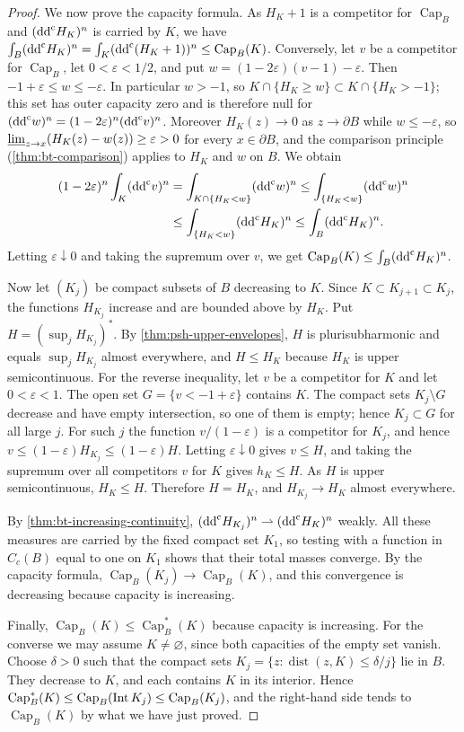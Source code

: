 \begin{proof}
We now prove the capacity formula. As $H_K+1$ is a competitor for $\operatorname{Cap}_B$ and $(\mathrm{dd}^{\mathrm{c}} H_K)^n$ is carried by $K$, we have $\int_B(\mathrm{dd}^{\mathrm{c}} H_K)^n=\int_K(\mathrm{dd}^{\mathrm{c}}(H_K+1))^n\le\operatorname{Cap}_B(K)$. Conversely, let $v$ be a competitor for $\operatorname{Cap}_B$, let $0<\varepsilon<1/2$, and put $w=(1-2\varepsilon)(v-1)-\varepsilon$. Then $-1+\varepsilon\le w\le-\varepsilon$. In particular $w>-1$, so $K\cap\{H_K\ge w\}\subset K\cap\{H_K>-1\}$; this set has outer capacity zero and is therefore null for $(\mathrm{dd}^{\mathrm{c}} w)^n=(1-2\varepsilon)^n(\mathrm{dd}^{\mathrm{c}} v)^n$. Moreover $H_K(z)\to0$ as $z\to\partial B$ while $w\le-\varepsilon$, so $\varliminf_{z\to x}(H_K(z)-w(z))\ge\varepsilon>0$ for every $x\in\partial B$, and the comparison principle (\cref{thm:bt-comparison}) applies to $H_K$ and $w$ on $B$. We obtain
\[
 \begin{aligned}
 (1-2\varepsilon)^n\int_K(\mathrm{dd}^{\mathrm{c}} v)^n
 &=\int_{K\cap\{H_K<w\}}(\mathrm{dd}^{\mathrm{c}} w)^n
 \le\int_{\{H_K<w\}}(\mathrm{dd}^{\mathrm{c}} w)^n\\
 &\le\int_{\{H_K<w\}}(\mathrm{dd}^{\mathrm{c}} H_K)^n
 \le\int_B(\mathrm{dd}^{\mathrm{c}} H_K)^n.
 \end{aligned}
\]
Letting $\varepsilon\downarrow0$ and taking the supremum over $v$, we get $\operatorname{Cap}_B(K)\le\int_B(\mathrm{dd}^{\mathrm{c}} H_K)^n$.

Now let $(K_j)$ be compact subsets of $B$ decreasing to $K$. Since $K\subset K_{j+1}\subset K_j$, the functions $H_{K_j}$ increase and are bounded above by $H_K$. Put $H=(\sup_jH_{K_j})^*$. By \cref{thm:psh-upper-envelopes}, $H$ is plurisubharmonic and equals $\sup_jH_{K_j}$ almost everywhere, and $H\le H_K$ because $H_K$ is upper semicontinuous. For the reverse inequality, let $v$ be a competitor for $K$ and let $0<\varepsilon<1$. The open set $G=\{v<-1+\varepsilon\}$ contains $K$. The compact sets $K_j\setminus G$ decrease and have empty intersection, so one of them is empty; hence $K_j\subset G$ for all large $j$. For such $j$ the function $v/(1-\varepsilon)$ is a competitor for $K_j$, and hence $v\le(1-\varepsilon)H_{K_j}\le(1-\varepsilon)H$. Letting $\varepsilon\downarrow0$ gives $v\le H$, and taking the supremum over all competitors $v$ for $K$ gives $h_K\le H$. As $H$ is upper semicontinuous, $H_K\le H$. Therefore $H=H_K$, and $H_{K_j}\to H_K$ almost everywhere.

By \cref{thm:bt-increasing-continuity}, $(\mathrm{dd}^{\mathrm{c}} H_{K_j})^n\rightharpoonup(\mathrm{dd}^{\mathrm{c}} H_K)^n$ weakly. All these measures are carried by the fixed compact set $K_1$, so testing with a function in $C_c(B)$ equal to one on $K_1$ shows that their total masses converge. By the capacity formula, $\operatorname{Cap}_B(K_j)\to\operatorname{Cap}_B(K)$, and this convergence is decreasing because capacity is increasing.

Finally, $\operatorname{Cap}_B(K)\le\operatorname{Cap}_B^*(K)$ because capacity is increasing. For the converse we may assume $K\neq\varnothing$, since both capacities of the empty set vanish. Choose $\delta>0$ such that the compact sets $K_j=\{z:\operatorname{dist}(z,K)\le\delta/j\}$ lie in $B$. They decrease to $K$, and each contains $K$ in its interior. Hence $\operatorname{Cap}_B^*(K)\le\operatorname{Cap}_B(\operatorname{Int} K_j)\le\operatorname{Cap}_B(K_j)$, and the right-hand side tends to $\operatorname{Cap}_B(K)$ by what we have just proved.
\end{proof}
